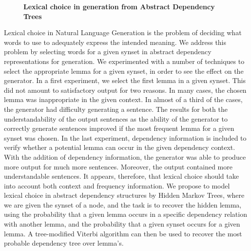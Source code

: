 \documentclass[10pt, a4paper, twopage, headinclude, footinclude, BCOR5mm]{book}
\begin{document}
\newpage

\begin{figure}[t!]
\centering
\large\textbf{Lexical choice in generation from Abstract Dependency Trees}
\vspace*{0.5cm}
\end{figure}


\begin{table}[t!]
\end{table} 
\noindent
Lexical choice in Natural Language Generation is the problem of deciding what words to use to adequately express the intended meaning. We address this problem by selecting  words for a given synset in abstract dependency representations for generation. We experimented with a number of techniques to select the appropriate lemma for a given synset, in order to see the effect on the generator.  In a first experiment, we select the first lemma in a given synset. This did not amount to satisfactory output for two reasons. In many cases, the chosen lemma was inappropriate in the given context. In almost of a third of the cases, the generator had difficulty generating a sentence. The results for both the understandability of the output sentences as the ability of the generator to  correctly generate sentences improved if the most frequent lemma for a given synset was chosen. In the last experiment, dependency information is included to verify whether a potential lemma can occur in the given dependency context. With the addition of dependency information, the generator was able to produce more output for much more sentences. Moreover, the output contained more understandable sentences.  It appears, therefore, that lexical choice should take into account both context and frequency information. We propose to model lexical choice in abstract dependency structures by Hidden Markov Trees, where we are given the synset of a node, and the task is to recover the hidden lemma, using the probability that a given lemma occurs in a specific dependency relation with another lemma, and the probability that a given synset occurs for a given lemma. A tree-modified Viterbi algorithm can then be used to recover the most probable dependency tree over lemma's.   
\end{document}
